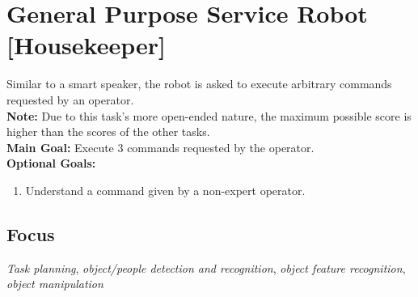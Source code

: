 \section{General Purpose Service Robot [Housekeeper]}
\label{test:gpsr}
Similar to a smart speaker, the robot is asked to execute arbitrary commands requested by an operator.\\
\textbf{Note:} Due to this task's more open-ended nature, the maximum possible score is higher than the scores of the other \SONE{} tasks.\\

\noindent \textbf{Main Goal:} Execute 3 commands requested by the operator.\\

\noindent \textbf{Optional Goals:}
\begin{enumerate}[nosep]
	\item Understand a command given by a non-expert operator.
\end{enumerate}

\subsection*{Focus}
\emph{Task planning}, \emph{object/people detection and recognition}, \emph{object feature recognition}, \emph{object manipulation}

